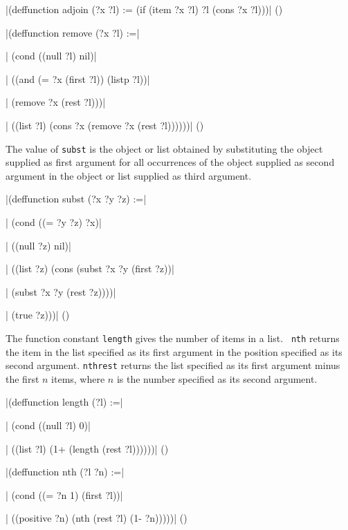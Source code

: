 \medskip
\verbatim|(deffunction adjoin (?x ?l) := (if (item ?x ?l) ?l (cons ?x ?l)))|
\hfill(\equation)\par
\medskip

\medskip
\verbatim|(deffunction remove (?x ?l) :=|\par
\verbatim|  (cond ((null ?l) nil)|\par
\verbatim|        ((and (= ?x (first ?l)) (listp ?l))|\par
\verbatim|         (remove ?x (rest ?l)))|\par
\verbatim|        ((list ?l) (cons ?x (remove ?x (rest ?l))))))|
\hfill(\equation)\par
\medskip

The value of {\tt subst} is the object or list obtained by substituting the
object supplied as first argument for all occurrences of the object
supplied as second argument in the object or list supplied as third argument.

\medskip
\verbatim|(deffunction subst (?x ?y ?z) :=|\par
\verbatim|  (cond ((= ?y ?z) ?x)|\par
\verbatim|        ((null ?z) nil)|\par
\verbatim|        ((list ?z) (cons (subst ?x ?y (first ?z))|\par
\verbatim|                         (subst ?x ?y (rest ?z))))|\par
\verbatim|        (true ?z)))|
\hfill(\equation)\par


The function constant {\tt length} gives the number of items in a list.  {\tt
nth} returns the item in the list specified as its first argument in the
position specified as its second argument.  {\tt nthrest} returns the list
specified as its first argument minus the first $n$ items, where $n$ is
the number specified as its second argument.

\medskip
\verbatim|(deffunction length (?l) :=|\par\nobreak
\verbatim|   (cond ((null ?l) 0)|\par\nobreak
\verbatim|         ((list ?l) (1+ (length (rest ?l))))))|
\hfill(\equation)\par
\medskip

\medskip
\verbatim|(deffunction nth (?l ?n) :=|\par
\verbatim|   (cond ((= ?n 1) (first ?l))|\par
\verbatim|         ((positive ?n) (nth (rest ?l) (1- ?n)))))|
\hfill(\equation)\par
\medskip

